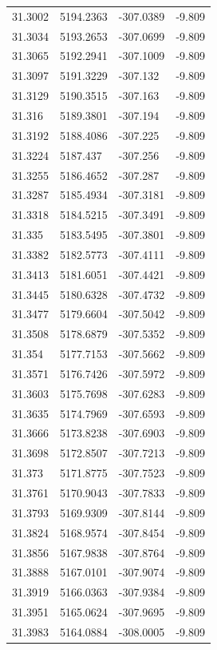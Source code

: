 \begin{table}[H]
\begin{tabular}{llll}
31.3002 & 5194.2363 & -307.0389 & -9.809 \\
31.3034 & 5193.2653 & -307.0699 & -9.809 \\
31.3065 & 5192.2941 & -307.1009 & -9.809 \\
31.3097 & 5191.3229 & -307.132 & -9.809 \\
31.3129 & 5190.3515 & -307.163 & -9.809 \\
31.316 & 5189.3801 & -307.194 & -9.809 \\
31.3192 & 5188.4086 & -307.225 & -9.809 \\
31.3224 & 5187.437 & -307.256 & -9.809 \\
31.3255 & 5186.4652 & -307.287 & -9.809 \\
31.3287 & 5185.4934 & -307.3181 & -9.809 \\
31.3318 & 5184.5215 & -307.3491 & -9.809 \\
31.335 & 5183.5495 & -307.3801 & -9.809 \\
31.3382 & 5182.5773 & -307.4111 & -9.809 \\
31.3413 & 5181.6051 & -307.4421 & -9.809 \\
31.3445 & 5180.6328 & -307.4732 & -9.809 \\
31.3477 & 5179.6604 & -307.5042 & -9.809 \\
31.3508 & 5178.6879 & -307.5352 & -9.809 \\
31.354 & 5177.7153 & -307.5662 & -9.809 \\
31.3571 & 5176.7426 & -307.5972 & -9.809 \\
31.3603 & 5175.7698 & -307.6283 & -9.809 \\
31.3635 & 5174.7969 & -307.6593 & -9.809 \\
31.3666 & 5173.8238 & -307.6903 & -9.809 \\
31.3698 & 5172.8507 & -307.7213 & -9.809 \\
31.373 & 5171.8775 & -307.7523 & -9.809 \\
31.3761 & 5170.9043 & -307.7833 & -9.809 \\
31.3793 & 5169.9309 & -307.8144 & -9.809 \\
31.3824 & 5168.9574 & -307.8454 & -9.809 \\
31.3856 & 5167.9838 & -307.8764 & -9.809 \\
31.3888 & 5167.0101 & -307.9074 & -9.809 \\
31.3919 & 5166.0363 & -307.9384 & -9.809 \\
31.3951 & 5165.0624 & -307.9695 & -9.809 \\
31.3983 & 5164.0884 & -308.0005 & -9.809 \\

\end{tabular}
\end{table}
